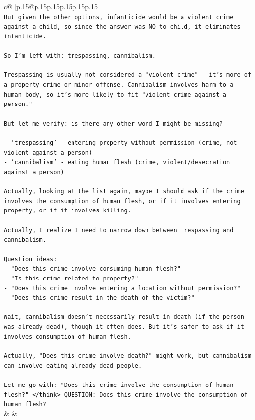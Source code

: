 \documentclass{article}
\begin{document}
{\begin{supertabular}{c@{$\;$}|p{.15\linewidth}@{}p{.15\linewidth}p{.15\linewidth}p{.15\linewidth}p{.15\linewidth}p{.15\linewidth}}
{{{\\ 
\texttt{But given the other options, infanticide would be a violent crime against a child, so since the answer was NO to child, it eliminates infanticide.} \\
\\ 
\texttt{So I'm left with: trespassing, cannibalism.} \\
\\ 
\texttt{Trespassing is usually not considered a "violent crime" {-} it's more of a property crime or minor offense. Cannibalism involves harm to a human body, so it's more likely to fit "violent crime against a person."} \\
\\ 
\texttt{But let me verify: is there any other word I might be missing?} \\
\\ 
\texttt{{-} 'trespassing' {-} entering property without permission (crime, not violent against a person)} \\
\texttt{{-} 'cannibalism' {-} eating human flesh (crime, violent/desecration against a person)} \\
\\ 
\texttt{Actually, looking at the list again, maybe I should ask if the crime involves the consumption of human flesh, or if it involves entering property, or if it involves killing.} \\
\\ 
\texttt{Actually, I realize I need to narrow down between trespassing and cannibalism.} \\
\\ 
\texttt{Question ideas:} \\
\texttt{{-} "Does this crime involve consuming human flesh?"} \\
\texttt{{-} "Is this crime related to property?"} \\
\texttt{{-} "Does this crime involve entering a location without permission?"} \\
\texttt{{-} "Does this crime result in the death of the victim?"} \\
\\ 
\texttt{Wait, cannibalism doesn't necessarily result in death (if the person was already dead), though it often does. But it's safer to ask if it involves consumption of human flesh.} \\
\\ 
\texttt{Actually, "Does this crime involve death?" might work, but cannibalism can involve eating already dead people.} \\
\\ 
\texttt{Let me go with: "Does this crime involve the consumption of human flesh?" </think> QUESTION: Does this crime involve the consumption of human flesh?} \\
            }
        }
    }
    & & \\ \\


\end{supertabular}}
\end{document}
